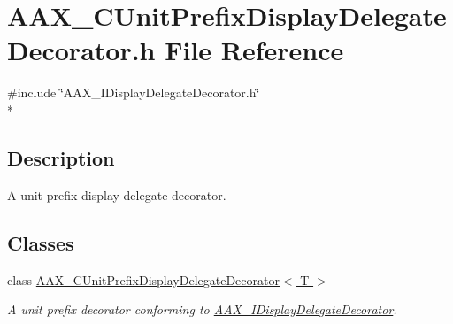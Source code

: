 \hypertarget{a00200}{}\section{A\+A\+X\+\_\+\+C\+Unit\+Prefix\+Display\+Delegate\+Decorator.\+h File Reference}
\label{a00200}
{\ttfamily \#include \char`\"{}A\+A\+X\+\_\+\+I\+Display\+Delegate\+Decorator.\+h\char`\"{}}\\*


\subsection{Description}
A unit prefix display delegate decorator. 

\subsection*{Classes}
\begin{DoxyCompactItemize}
\item 
class \hyperlink{a00046}{A\+A\+X\+\_\+\+C\+Unit\+Prefix\+Display\+Delegate\+Decorator$<$ T $>$}
\begin{DoxyCompactList}\small\item\em A unit prefix decorator conforming to \hyperlink{a00094}{A\+A\+X\+\_\+\+I\+Display\+Delegate\+Decorator}. \end{DoxyCompactList}\end{DoxyCompactItemize}
